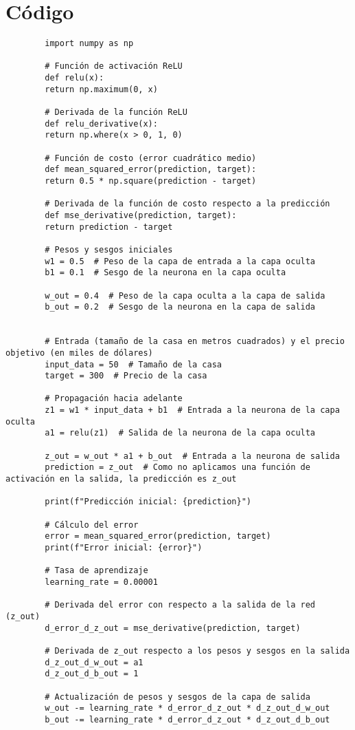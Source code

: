 \documentclass{article}
\begin{document}
	\section{Código}
	\begin{verbatim}
		import numpy as np
		
		# Función de activación ReLU
		def relu(x):
		return np.maximum(0, x)
		
		# Derivada de la función ReLU
		def relu_derivative(x):
		return np.where(x > 0, 1, 0)
		
		# Función de costo (error cuadrático medio)
		def mean_squared_error(prediction, target):
		return 0.5 * np.square(prediction - target)
		
		# Derivada de la función de costo respecto a la predicción
		def mse_derivative(prediction, target):
		return prediction - target
		
		# Pesos y sesgos iniciales
		w1 = 0.5  # Peso de la capa de entrada a la capa oculta
		b1 = 0.1  # Sesgo de la neurona en la capa oculta
		
		w_out = 0.4  # Peso de la capa oculta a la capa de salida
		b_out = 0.2  # Sesgo de la neurona en la capa de salida
		
		
		# Entrada (tamaño de la casa en metros cuadrados) y el precio objetivo (en miles de dólares)
		input_data = 50  # Tamaño de la casa
		target = 300  # Precio de la casa
		
		# Propagación hacia adelante
		z1 = w1 * input_data + b1  # Entrada a la neurona de la capa oculta
		a1 = relu(z1)  # Salida de la neurona de la capa oculta
		
		z_out = w_out * a1 + b_out  # Entrada a la neurona de salida
		prediction = z_out  # Como no aplicamos una función de activación en la salida, la predicción es z_out
		
		print(f"Predicción inicial: {prediction}")
		
		# Cálculo del error
		error = mean_squared_error(prediction, target)
		print(f"Error inicial: {error}")
		
		# Tasa de aprendizaje
		learning_rate = 0.00001
		
		# Derivada del error con respecto a la salida de la red (z_out)
		d_error_d_z_out = mse_derivative(prediction, target)
		
		# Derivada de z_out respecto a los pesos y sesgos en la salida
		d_z_out_d_w_out = a1
		d_z_out_d_b_out = 1
		
		# Actualización de pesos y sesgos de la capa de salida
		w_out -= learning_rate * d_error_d_z_out * d_z_out_d_w_out
		b_out -= learning_rate * d_error_d_z_out * d_z_out_d_b_out
		

\end{verbatim}
\end{document}

